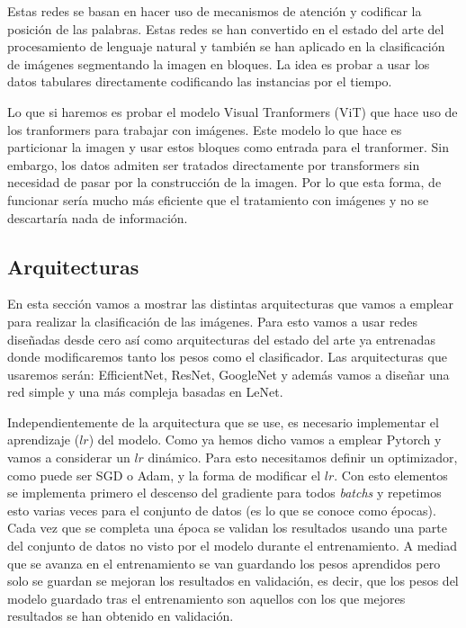 \documentclass[a4paper,12pt,twoside,titlepage]{article}
\begin{document}
Estas redes se basan en hacer uso de mecanismos de atención y codificar la posición de las palabras. Estas redes se han convertido en el estado del arte del procesamiento de lenguaje natural y también se han aplicado en la clasificación de imágenes segmentando la imagen en bloques. La idea es probar a usar los datos tabulares directamente codificando las instancias por el tiempo.

Lo que si haremos es probar el modelo Visual Tranformers (ViT) que hace uso de los tranformers para trabajar con imágenes. Este modelo lo que hace es particionar la imagen y usar estos bloques como entrada para el tranformer. Sin embargo, los datos admiten ser tratados directamente por transformers sin necesidad de pasar por la construcción de la imagen. Por lo que esta forma, de funcionar sería mucho más eficiente que el tratamiento con imágenes y no se descartaría nada de información. 

\subsection{Arquitecturas}

En esta sección vamos a mostrar las distintas arquitecturas que vamos a emplear para realizar la clasificación de las imágenes. Para esto vamos a usar redes diseñadas desde cero así como arquitecturas del estado del arte ya entrenadas donde modificaremos tanto los pesos como el clasificador. Las arquitecturas que usaremos serán: EfficientNet, ResNet, GoogleNet y además vamos a diseñar una red simple y una más compleja basadas en LeNet.

Independientemente de la arquitectura que se use, es necesario implementar el aprendizaje ($lr$) del modelo. Como ya hemos dicho vamos a emplear Pytorch y vamos a considerar un $lr$ dinámico. Para esto necesitamos definir un optimizador, como puede ser SGD o Adam, y la forma de modificar el $lr$. Con esto elementos se implementa primero el descenso del gradiente para todos \textit{batchs} y repetimos esto varias veces para el conjunto de datos (es lo que se conoce como épocas). Cada vez que se completa una época se validan los resultados usando una parte del conjunto de datos no visto por el modelo durante el entrenamiento. A mediad que se avanza en el entrenamiento se van guardando los pesos aprendidos pero solo se guardan se mejoran los resultados en validación, es decir, que los pesos del modelo guardado tras el entrenamiento son aquellos con los que mejores resultados se han obtenido en validación.
\end{document}

